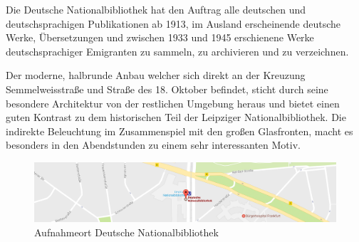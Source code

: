 \documentclass[liststotoc,bibtotoc,fontsize=14pt,]{scrreprt}
\begin{document}
\bigskip
Die Deutsche Nationalbibliothek hat den Auftrag alle deutschen und deutschsprachigen Publikationen ab 1913, im Ausland erscheinende deutsche Werke, Übersetzungen und zwischen 1933 und 1945 erschienene Werke deutschsprachiger Emigranten zu sammeln, zu archivieren und zu verzeichnen. 

\bigskip
Der moderne, halbrunde Anbau welcher sich direkt an der Kreuzung Semmelweisstraße und Straße des 18. Oktober befindet, sticht durch seine besondere Architektur von der restlichen Umgebung heraus und bietet einen guten Kontrast zu dem historischen Teil der Leipziger Nationalbibliothek. Die indirekte Beleuchtung im Zusammenspiel mit den großen Glasfronten, macht es besonders in den Abendstunden zu einem sehr interessanten Motiv. 

\begin{figure}[H]
	\includegraphics[width=\linewidth]{img/places/bibo_map.jpg}
	\caption{Aufnahmeort Deutsche Nationalbibliothek}
	\label{img:ak_map}
\end{figure}
	
\end{document}
